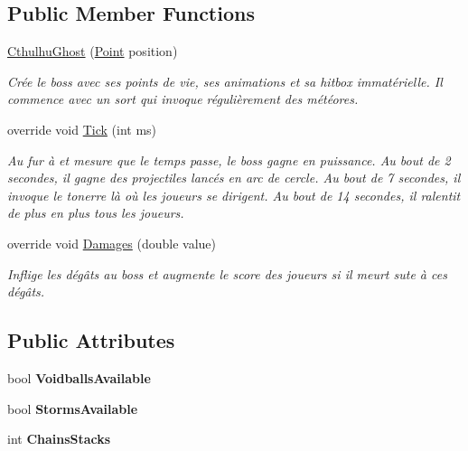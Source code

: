 \subsection*{Public Member Functions}
\begin{DoxyCompactItemize}
\item 
\hyperlink{class_tentacle_slicers_1_1customs_1_1_cthulhu_ghost_a36e583df37dcb6535a39af1c29d00eef}{Cthulhu\+Ghost} (\hyperlink{class_tentacle_slicers_1_1general_1_1_point}{Point} position)
\begin{DoxyCompactList}\small\item\em Crée le boss avec ses points de vie, ses animations et sa hitbox immatérielle. Il commence avec un sort qui invoque régulièrement des météores. \end{DoxyCompactList}\item 
override void \hyperlink{class_tentacle_slicers_1_1customs_1_1_cthulhu_ghost_a402aea79e343f8f5a1b153a143edf9fb}{Tick} (int ms)
\begin{DoxyCompactList}\small\item\em Au fur à et mesure que le temps passe, le boss gagne en puissance. Au bout de 2 secondes, il gagne des projectiles lancés en arc de cercle. Au bout de 7 secondes, il invoque le tonerre là où les joueurs se dirigent. Au bout de 14 secondes, il ralentit de plus en plus tous les joueurs. \end{DoxyCompactList}\item 
override void \hyperlink{class_tentacle_slicers_1_1customs_1_1_cthulhu_ghost_aeeb398970bf8433917fe035f5ec47f66}{Damages} (double value)
\begin{DoxyCompactList}\small\item\em Inflige les dégâts au boss et augmente le score des joueurs si il meurt sute à ces dégâts. \end{DoxyCompactList}\end{DoxyCompactItemize}
\subsection*{Public Attributes}
\begin{DoxyCompactItemize}
\item 
\mbox{\label{class_tentacle_slicers_1_1customs_1_1_cthulhu_ghost_a72570b7cf336bc67c977c3438552ef7b}} 
bool {\bfseries Voidballs\+Available}
\item 
\mbox{\label{class_tentacle_slicers_1_1customs_1_1_cthulhu_ghost_a83f3bf7a7847e18c026ac6b193482b4a}} 
bool {\bfseries Storms\+Available}
\item 
\mbox{\label{class_tentacle_slicers_1_1customs_1_1_cthulhu_ghost_ad7f2ceed99f2c6372ff8673b8c027868}} 
int {\bfseries Chains\+Stacks}
\end{DoxyCompactItemize}
